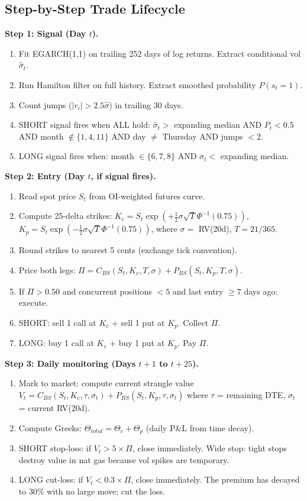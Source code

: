 \documentclass[11pt,a4paper]{article}
\begin{document}
\subsection{Step-by-Step Trade Lifecycle}

\textbf{Step 1: Signal (Day $t$).}
\begin{enumerate}[nosep]
\item Fit EGARCH(1,1) on trailing 252 days of log returns. Extract conditional vol $\hat{\sigma}_t$.
\item Run Hamilton filter on full history. Extract smoothed probability $P(s_t = 1)$.
\item Count jumps ($|r_i| > 2.5\hat{\sigma}$) in trailing 30 days.
\item SHORT signal fires when ALL hold: $\hat{\sigma}_t >$ expanding median AND $P_t < 0.5$ AND month $\notin \{1,4,11\}$ AND day $\neq$ Thursday AND jumps $< 2$.
\item LONG signal fires when: month $\in \{6,7,8\}$ AND $\hat{\sigma}_t <$ expanding median.
\end{enumerate}

\textbf{Step 2: Entry (Day $t$, if signal fires).}
\begin{enumerate}[nosep]
\item Read spot price $S_t$ from OI-weighted futures curve.
\item Compute 25-delta strikes: $K_c = S_t \exp(+\frac{1}{2}\sigma\sqrt{T}\Phi^{-1}(0.75))$, $K_p = S_t \exp(-\frac{1}{2}\sigma\sqrt{T}\Phi^{-1}(0.75))$, where $\sigma = $ RV(20d), $T = 21/365$.
\item Round strikes to nearest 5 cents (exchange tick convention).
\item Price both legs: $\Pi = C_{BS}(S_t, K_c, T, \sigma) + P_{BS}(S_t, K_p, T, \sigma)$.
\item If $\Pi > 0.50$ and concurrent positions $< 5$ and last entry $\geq 7$ days ago: execute.
\item SHORT: sell 1 call at $K_c$ + sell 1 put at $K_p$. Collect $\Pi$.
\item LONG: buy 1 call at $K_c$ + buy 1 put at $K_p$. Pay $\Pi$.
\end{enumerate}

\textbf{Step 3: Daily monitoring (Days $t+1$ to $t+25$).}
\begin{enumerate}[nosep]
\item Mark to market: compute current strangle value $V_t = C_{BS}(S_t, K_c, \tau, \sigma_t) + P_{BS}(S_t, K_p, \tau, \sigma_t)$ where $\tau$ = remaining DTE, $\sigma_t$ = current RV(20d).
\item Compute Greeks: $\Theta_{total} = \Theta_c + \Theta_p$ (daily P\&L from time decay).
\item SHORT stop-loss: if $V_t > 5 \times \Pi$, close immediately. Wide stop: tight stops destroy value in nat gas because vol spikes are temporary.
\item LONG cut-loss: if $V_t < 0.3 \times \Pi$, close immediately. The premium has decayed to 30\% with no large move; cut the loss.
\end{enumerate}
\end{document}
